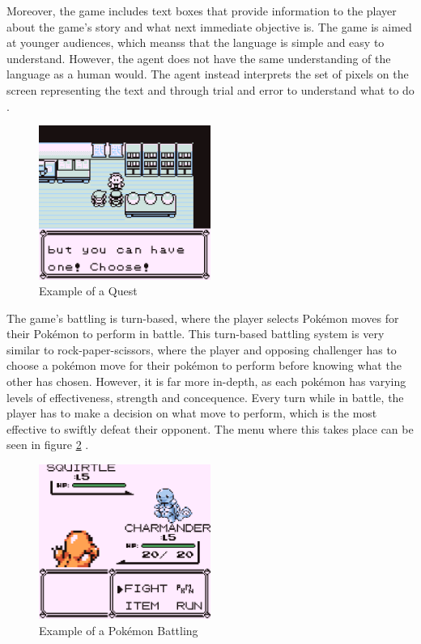 Moreover, the game includes text boxes that provide information to the player about the game's story and what next immediate objective is. The game is aimed at younger audiences, which meanss that the language is simple and easy to understand. However, the agent does not have the same understanding of the language as a human would. The agent instead interprets the set of pixels on the screen representing the text and through trial and error to understand what to do \cite{HubZ_1998}. 

\begin{figure}[H]
    \centering
    \includegraphics[width=0.5\textwidth]{figures/red_quest_example.png}
    \caption{Example of a Quest}
    \label{fig:pkmn_quest}
\end{figure}

The game's battling is turn-based, where the player selects Pokémon moves for their Pokémon to perform in battle. This turn-based battling system is very similar to rock-paper-scissors, where the player and opposing challenger has to choose a pokémon move for their pokémon to perform before knowing what the other has chosen. However, it is far more in-depth, as each pokémon has varying levels of effectiveness, strength and concequence. Every turn while in battle, the player has to make a decision on what move to perform, which is the most effective to swiftly defeat their opponent. The menu where this takes place can be seen in figure \ref{fig:pkmn_battling} \cite{HubZ_1998}.

\begin{figure}[H]
    \centering
    \includegraphics[width=0.5\textwidth]{figures/red_battling.png}
    \caption{Example of a Pokémon Battling}
    \label{fig:pkmn_battling}
\end{figure}

